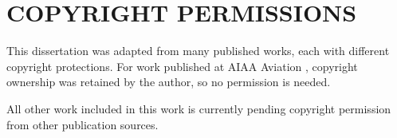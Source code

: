 \documentclass{UCF_ETD}
\begin{document}
\appendix

\chapter{COPYRIGHT PERMISSIONS}
This dissertation was adapted from many published works, each with different copyright protections. For work published at AIAA Aviation \cite{CavainoloAviation24, Cavainolo2023,Cavainolo2022}, copyright ownership was retained by the author, so no permission is needed. 

All other work included in this work is currently pending copyright permission from other publication sources.







\backmatter

\end{document}

